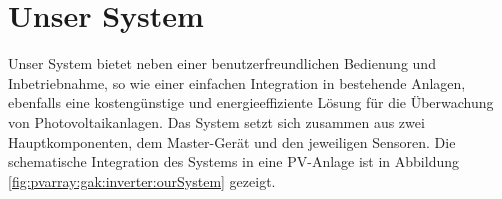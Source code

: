 \section{Unser System}
\label{sec:ourSystem}

Unser   System  bietet   neben   einer   benutzerfreundlichen  Bedienung   und
Inbetriebnahme,  so wie  einer  einfachen Integration  in bestehende  Anlagen,
ebenfalls  eine  kosteng\"unstige  und energieeffiziente  L\"osung  f\"ur  die
\"Uberwachung  von Photovoltaikanlagen. Das  System  setzt  sich zusammen  aus
zwei  Hauptkomponenten, dem  Master-Ger\"at und  den jeweiligen  Sensoren. Die
schematische  Integration  des Systems  in  eine  PV-Anlage ist  in  Abbildung
\ref{fig:pvarray:gak:inverter:ourSystem} gezeigt.


